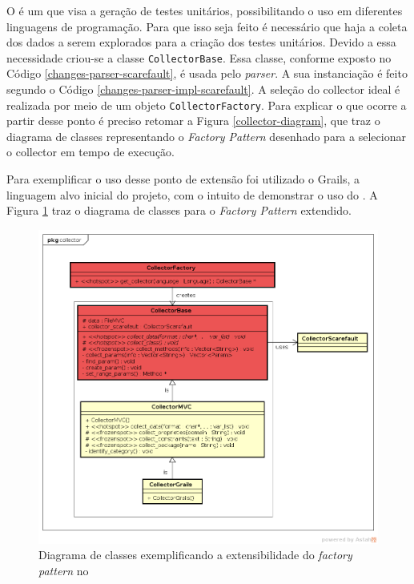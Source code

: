 O \scarefault é um \framework que visa a geração de testes unitários, possibilitando
o uso em diferentes linguagens de programação. Para que isso seja feito é necessário
que haja a coleta dos dados a serem explorados para a criação dos testes unitários.
Devido a essa necessidade criou-se a classe \lstinline|CollectorBase|. Essa classe,
conforme exposto no Código \ref{changes-parser-scarefault}, é usada pelo \textit{parser}.
A sua instanciação é feito segundo o Código \ref{changes-parser-impl-scarefault}. A seleção do \textsf{collector} ideal é realizada por meio de um objeto \lstinline|CollectorFactory|. Para explicar o que ocorre a partir desse ponto é preciso retomar a Figura
\ref{collector-diagram}, que traz o diagrama de classes representando o
\textit{Factory Pattern} desenhado para a selecionar o \textsf{collector} em tempo
de execução.

Para exemplificar o uso desse ponto de extensão foi utilizado o \textsf{Grails}, a linguagem
alvo inicial do projeto, com o intuito de demonstrar o uso do \Scarefault. A Figura
\ref{collector-grails-class-diagram} traz o diagrama de classes para o
\textit{Factory Pattern} extendido.
\begin{figure}[h]
  \centering
    \includegraphics[width=\textwidth]{figuras/collector-grails-class-diagram.png}
    \caption{Diagrama de classes exemplificando a extensibilidade do \textit{factory pattern} no \framework}
    \label{collector-grails-class-diagram}
\end{figure}
\FloatBarrier

